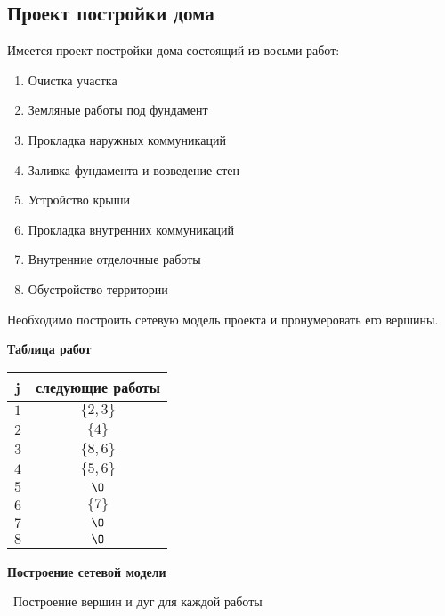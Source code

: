 \subsection{Проект постройки дома}


Имеется проект постройки дома состоящий из восьми работ:

\bigskip

\begin{enumerate}[nosep]
	\item Очистка участка
	\item Земляные работы под фундамент
	\item Прокладка наружных коммуникаций
	\item Заливка фундамента и возведение стен
	\item Устройство крыши
	\item Прокладка внутренних коммуникаций
	\item Внутренние отделочные работы
	\item Обустройство территории
\end{enumerate}

\bigskip

Необходимо построить сетевую модель проекта и пронумеровать его вершины.

\bigskip

\textbf{Таблица работ}

\begin{table}[H]
	\centering
	\begin{tabular}{ | c | c | } 
		\hline
		j & следующие работы \\\hline
		$1$ & $\{2,3\}$ \\\hline
		$2$ & $\{4\}$ \\\hline
		$3$ & $\{8,6\}$ \\\hline
		$4$ & $\{5,6\}$ \\\hline
		$5$ & $\O$ \\\hline
		$6$ & $\{7\}$ \\\hline
		$7$ & $\O$ \\\hline
		$8$ & $\O$ \\\hline
	\end{tabular}
\end{table}

\bigskip

\textbf{Построение сетевой модели}

 $\,$ Построение вершин и дуг для каждой работы

